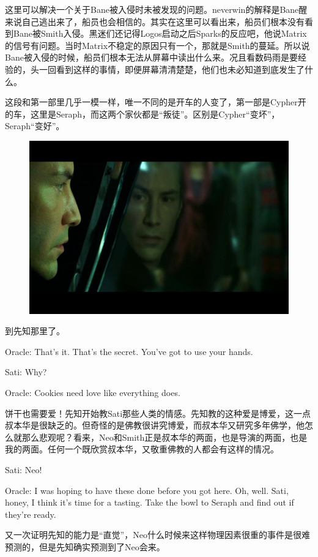 \documentclass[UTF8]{ctexart}
\newenvironment{myquote}{\color{green} \setlength{\leftskip}{6em} \setlength{\rightskip}{4em} \setlength{\parindent}{-2em}}{\par}
\begin{document}
这里可以解决一个关于Bane被入侵时未被发现的问题。neverwin的解释是Bane醒来说自己逃出来了，船员也会相信的。其实在这里可以看出来，船员们根本没有看到Bane被Smith入侵。黑迷们还记得Logos启动之后Sparks的反应吧，他说Matrix的信号有问题。当时Matrix不稳定的原因只有一个，那就是Smith的蔓延。所以说Bane被入侵的时候，船员们根本无法从屏幕中读出什么来。况且看数码雨是要经验的，头一回看到这样的事情，即便屏幕清清楚楚，他们也未必知道到底发生了什么。

这段和第一部里几乎一模一样，唯一不同的是开车的人变了，第一部是Cypher开的车，这里是Seraph，而这两个家伙都是“叛徒”。区别是Cypher“变坏”，Seraph“变好”。

\begin{figure}[htb]
\centering
\includegraphics[width=0.5\linewidth]{fig/f64563d08227bd8fa0ec9ce3.jpg}
\end{figure}

到先知那里了。

\begin{myquote}
Oracle: That's it. That's the secret. You've got to use your hands.

Sati: Why?

Oracle: Cookies need love like everything does.
\end{myquote}

饼干也需要爱！先知开始教Sati那些人类的情感。先知教的这种爱是博爱，这一点叔本华是很缺乏的。但奇怪的是佛教很讲究博爱，而叔本华又研究多年佛学，他怎么就那么悲观呢？看来，Neo和Smith正是叔本华的两面，也是导演的两面，也是我的两面。任何一个既欣赏叔本华，又敬重佛教的人都会有这样的情况。

\begin{myquote}
Sati: Neo!

Oracle: I was hoping to have these done before you got here. Oh, well. Sati, honey, I think it's time for a tasting. Take the bowl to Seraph and find out if they're ready.
\end{myquote}

又一次证明先知的能力是“直觉”，Neo什么时候来这样物理因素很重的事件是很难预测的，但是先知确实预测到了Neo会来。
\end{document}
